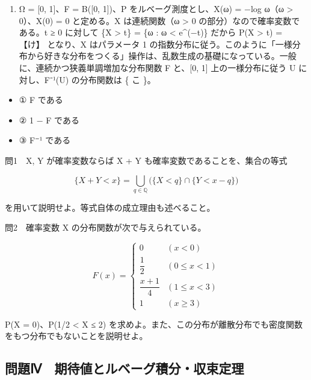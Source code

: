\documentclass[
  10pt,
  a4paper,
]{article}
\providecommand{\tightlist}{%
  \setlength{\itemsep}{0pt}\setlength{\parskip}{0pt}}
\begin{document}
\begin{enumerate}
\def\labelenumi{(\arabic{enumi})}
\setcounter{enumi}{2}
\tightlist
\item
  Ω = {[}0, 1{]}、F = B({[}0, 1{]})、P をルベーグ測度とし、X(ω) = −log
  ω（ω \textgreater{} 0）、X(0) = 0 と定める。X は連続関数（ω
  \textgreater{} 0 の部分）なので確率変数である。t ≥ 0 に対して \{X
  \textgreater{} t\} = \{ω : ω \textless{} e\^{}(−t)\} だから P(X
  \textgreater{} t) = 【け】 となり、X はパラメータ 1
  の指数分布に従う。このように「一様分布から好きな分布をつくる」操作は、乱数生成の基礎になっている。一般に、連続かつ狭義単調増加な分布関数
  F と、{[}0, 1{]} 上の一様分布に従う U に対し、F{\fallbackfont ⁻}¹(U)
  の分布関数は \{ こ \}。
\end{enumerate}

\begin{itemize}
\tightlist
\item
  ① F である
\item
  ② 1 − F である
\item
  ③ F{\fallbackfont ⁻}¹ である
\end{itemize}

問1　X, Y が確率変数ならば X + Y も確率変数であることを、集合の等式

\[\{X + Y < x\} = \bigcup_{q \in \mathbb{Q}} \big(\{X < q\} \cap \{Y < x - q\}\big)\]

を用いて説明せよ。等式自体の成立理由も述べること。

問2　確率変数 X の分布関数が次で与えられている。

\[F(x) = \begin{cases} 0 & (x < 0) \\ \dfrac{1}{2} & (0 \le x < 1) \\ \dfrac{x+1}{4} & (1 \le x < 3) \\ 1 & (x \ge 3) \end{cases}\]

P(X = 0)、P(1/2 \textless{} X ≤ 2)
を求めよ。また、この分布が離散分布でも密度関数をもつ分布でもないことを説明せよ。

\hypertarget{ux554fux984cux2173-ux671fux5f85ux5024ux3068ux30ebux30d9ux30fcux30b0ux7a4dux5206ux53ceux675fux5b9aux7406}{%
\subsection{問題Ⅳ　期待値とルベーグ積分・収束定理}\label{ux554fux984cux2173-ux671fux5f85ux5024ux3068ux30ebux30d9ux30fcux30b0ux7a4dux5206ux53ceux675fux5b9aux7406}}
\end{document}
